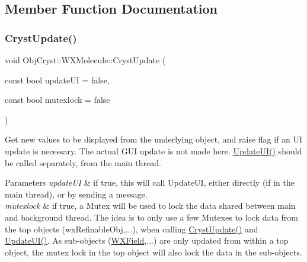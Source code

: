 \subsection{Member Function Documentation}
\mbox{\label{class_obj_cryst_1_1_w_x_molecule_a19b65e2f9b5da859675278ff74f3f5e9}} 
\subsubsection{\texorpdfstring{CrystUpdate()}{CrystUpdate()}}
{\footnotesize\ttfamily void Obj\+Cryst\+::\+W\+X\+Molecule\+::\+Cryst\+Update (\begin{DoxyParamCaption}\item[{const bool}]{update\+UI = {\ttfamily false},  }\item[{const bool}]{mutexlock = {\ttfamily false} }\end{DoxyParamCaption})\hspace{0.3cm}{\ttfamily [virtual]}}

Get new values to be displayed from the underlying object, and raise flag if an UI update is necessary. The actual G\+UI update is not made here. \mbox{\hyperlink{class_obj_cryst_1_1_w_x_molecule_ac234eca0ea8eb99e4d94387c506f1643}{Update\+U\+I()}} should be called separately, from the main thread.


\begin{DoxyParams}{Parameters}
{\em update\+UI} & if true, this will call Update\+UI, either directly (if in the main thread), or by sending a message. \\
\hline
{\em mutexlock} & if true, a Mutex will be used to lock the data shared between main and background thread. The idea is to only use a few Mutexes to lock data from the top objects (wx\+Refinable\+Obj,...), when calling \mbox{\hyperlink{class_obj_cryst_1_1_w_x_molecule_a19b65e2f9b5da859675278ff74f3f5e9}{Cryst\+Update()}} and \mbox{\hyperlink{class_obj_cryst_1_1_w_x_molecule_ac234eca0ea8eb99e4d94387c506f1643}{Update\+U\+I()}}. As sub-\/objects (\mbox{\hyperlink{class_obj_cryst_1_1_w_x_field}{W\+X\+Field}},...) are only updated from within a top object, the mutex lock in the top object will also lock the data in the sub-\/objects. \\
\hline
\end{DoxyParams}


